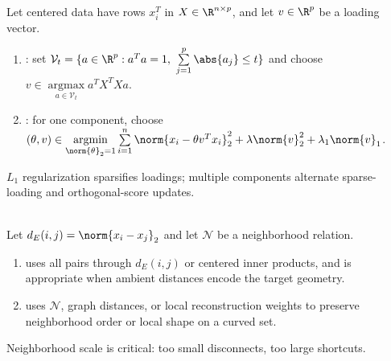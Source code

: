 \begin{method} \label{meth:sl-sparse-pca-objectives} \\
Let centered data have rows $x_i^T$ in $X\in\R^{n\times p}$, and let $v\in\R^p$ be a loading vector.
\begin{enumerate}[label=(\roman*)]
\setlength{\itemsep}{0pt}
\item {}: set $\mathcal{V}_t=\{a\in\R^p:a^Ta=1,\ \sum\limits_{j=1}^p\abs{a_j}\leq t\}$ and choose $v\in\operatorname*{argmax}\limits_{a\in\mathcal{V}_t}a^TX^TXa$.
\item {}: for one component, choose $(\theta,v)\in\operatorname*{argmin}\limits_{\norm{\theta}_2=1}\sum\limits_{i=1}^n\norm{x_i-\theta v^Tx_i}_2^2+\lambda\norm{v}_2^2+\lambda_1\norm{v}_1$.
\end{enumerate}
$L_1$ regularization sparsifies loadings; multiple components alternate sparse-loading and orthogonal-score updates.
\end{method}

\begin{remark} \label{rem:sl-local-versus-global-scaling} \\
Let $d_E(i,j)=\norm{x_i-x_j}_2$ and let $\mathcal{N}$ be a neighborhood relation.
\begin{enumerate}[label=(\roman*)]
\setlength{\itemsep}{0pt}
\item {} uses all pairs through $d_E(i,j)$ or centered inner products, and is appropriate when ambient distances encode the target geometry.
\item {} uses $\mathcal{N}$, graph distances, or local reconstruction weights to preserve neighborhood order or local shape on a curved set.
\end{enumerate}
Neighborhood scale is critical: too small disconnects, too large shortcuts.
\end{remark}
